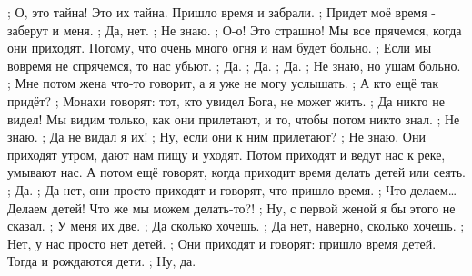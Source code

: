; О, это тайна! Это их тайна.  Пришло время и забрали.
; Придет моё время - заберут и меня.
; Да, нет.
; Не знаю.
; О-о! Это страшно! Мы все прячемся, когда они приходят. Потому, что очень много огня и нам будет больно.
; Если мы вовремя не спрячемся, то нас убьют.
; Да. 
;  Да. 
; Да.
; Не знаю, но ушам больно.
; Мне потом жена что-то говорит, а я уже не могу услышать.
; А кто ещё так придёт?
; Монахи говорят: тот, кто увидел Бога, не может жить.
; Да никто не видел! Мы видим только, как они прилетают, и то, чтобы  потом никто знал.
; Не знаю.
; Да не видал я их!
; Ну, если они к ним прилетают?
; Не знаю. Они приходят утром, дают нам пищу и уходят. Потом приходят и ведут нас к реке, умывают нас. А потом ещё говорят, когда приходит время делать детей или сеять.
; Да.
; Да нет, они просто приходят и говорят, что пришло время.
; Что делаем…Делаем детей! Что же мы можем делать-то?!
; Ну, с первой женой я бы этого не сказал.
; У меня их две. 
; Да сколько хочешь.
; Да нет, наверно, сколько хочешь.
; Нет, у нас просто нет детей.
; Они приходят и говорят: пришло время детей. Тогда и рождаются дети.
; Ну, да.
